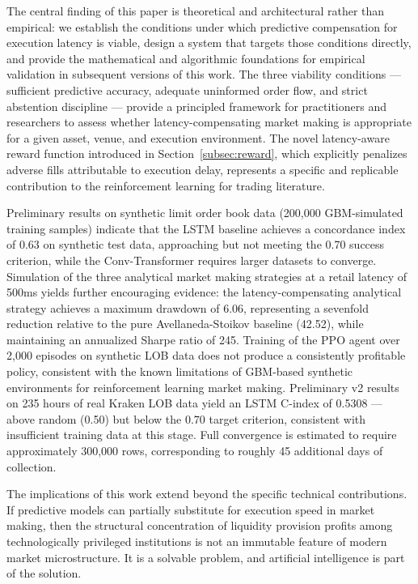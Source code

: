 \documentclass[12pt]{article}
\begin{document}
The central finding of this paper is theoretical and architectural rather than empirical: we establish the conditions under which predictive compensation for execution latency is viable, design a system that targets those conditions directly, and provide the mathematical and algorithmic foundations for empirical validation in subsequent versions of this work. The three viability conditions --- sufficient predictive accuracy, adequate uninformed order flow, and strict abstention discipline --- provide a principled framework for practitioners and researchers to assess whether latency-compensating market making is appropriate for a given asset, venue, and execution environment. The novel latency-aware reward function introduced in Section~\ref{subsec:reward}, which explicitly penalizes adverse fills attributable to execution delay, represents a specific and replicable contribution to the reinforcement learning for trading literature.

Preliminary results on synthetic limit order book data (200,000 GBM-simulated training samples) indicate that the LSTM baseline achieves a concordance index of 0.63 on synthetic test data, approaching but not meeting the 0.70 success criterion, while the Conv-Transformer requires larger datasets to converge. Simulation of the three analytical market making strategies at a retail latency of 500ms yields further encouraging evidence: the latency-compensating analytical strategy achieves a maximum drawdown of 6.06, representing a sevenfold reduction relative to the pure Avellaneda-Stoikov baseline (42.52), while maintaining an annualized Sharpe ratio of 245. Training of the PPO agent over 2,000 episodes on synthetic LOB data does not produce a consistently profitable policy, consistent with the known limitations of GBM-based synthetic environments for reinforcement learning market making. Preliminary v2 results on 235 hours of real Kraken LOB data yield an LSTM C-index of 0.5308 --- above random (0.50) but below the 0.70 target criterion, consistent with insufficient training data at this stage. Full convergence is estimated to require approximately 300,000 rows, corresponding to roughly 45 additional days of collection.

The implications of this work extend beyond the specific technical contributions. If predictive models can partially substitute for execution speed in market making, then the structural concentration of liquidity provision profits among technologically privileged institutions is not an immutable feature of modern market microstructure. It is a solvable problem, and artificial intelligence is part of the solution.
\end{document}
